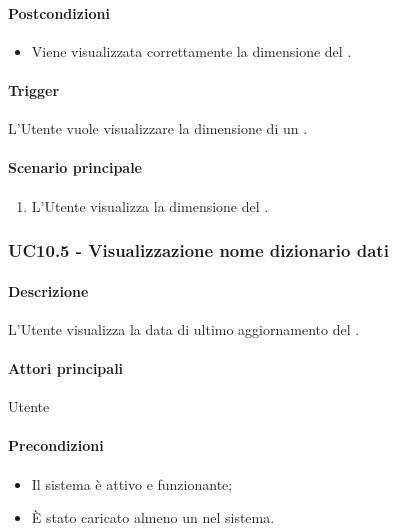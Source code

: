 \paragraph*{Postcondizioni}
\begin{itemize}
  \item Viene visualizzata correttamente la dimensione del .
\end{itemize}

\paragraph*{Trigger}
L'Utente vuole visualizzare la dimensione di un .

\paragraph*{Scenario principale}
\begin{enumerate}
  \item L'Utente visualizza la dimensione del .
\end{enumerate}


\subsubsection{UC10.5 - Visualizzazione nome dizionario dati}\label{UC10point5}
\paragraph*{Descrizione}
L'Utente visualizza la data di ultimo aggiornamento del .

\paragraph*{Attori principali}
Utente

\paragraph*{Precondizioni}
\begin{itemize}
  \item Il sistema è attivo e funzionante;
  \item È stato caricato almeno un  nel sistema. 
\end{itemize}

